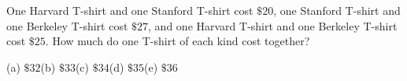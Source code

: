 One Harvard T-shirt and one Stanford T-shirt cost $\$20$, one Stanford T-shirt and one Berkeley T-shirt cost $\$27$, and one Harvard T-shirt and one Berkeley T-shirt cost $\$25$. How much do one T-shirt of each kind cost together?

(a) $\$32$\quad (b) $\$33$\quad (c) $\$34$\quad (d) $\$35$\quad (e) $\$36$
